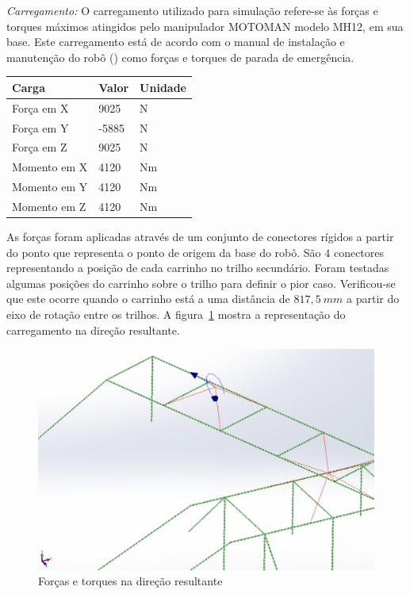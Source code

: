 \textit{Carregamento:} O carregamento utilizado para simulação
refere-se às forças e torques máximos atingidos pelo manipulador MOTOMAN modelo MH12, em
sua base. Este carregamento está de acordo com o manual de instalação e
manutenção do robô (\cite{MH12_manual}) como forças e torques de parada de
emergência.

\begin{center}
\centering
\begin{tabular}{|l|l|l|}
\hline
\textbf{Carga}		   & \textbf{Valor} & \textbf{Unidade}   \\ \hline
Força em X		       & 9025           & N	                 \\ \hline
Força em Y			   & -5885          & N                  \\ \hline
Força em Z			   & 9025           & N                  \\ \hline
Momento em X		   & 4120           & Nm                 \\ \hline
Momento em Y		   & 4120           & Nm                 \\ \hline
Momento em Z		   & 4120           & Nm                 \\ \hline
\end{tabular}
\label{tab::carregamento}
\end{center}

As forças foram aplicadas através de um conjunto de conectores rígidos a partir
do ponto que representa o ponto de origem da base do robô. São $4$ conectores
representando a posição de cada carrinho no trilho secundário. Foram testadas
algumas posições do carrinho sobre o trilho para definir o pior caso.
Verificou-se que este ocorre quando o carrinho está a uma distância de
$817,5~mm$ a partir do eixo de rotação entre os trilhos. 
A figura~\ref{fig::carregamento} mostra a representação do carregamento na
direção resultante.

\begin{figure}[h!]
	\centering
	\includegraphics[width=0.9\columnwidth]{method/figs/dimensionamento/carregamento}
	\caption{Forças e torques na direção resultante}
    \label{fig::carregamento}
\end{figure}


